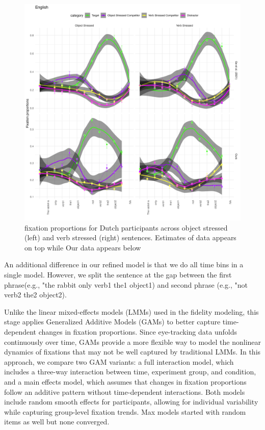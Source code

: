 \begin{figure}[H]  %
    \centering
    \includegraphics[width=\textwidth,height=\textheight,keepaspectratio]{viz/dutch_fix2.png}
    \caption{fixation proportions for Dutch participants across object stressed (left) and verb stressed (right) sentences. Estimates of \citep{Ge2021} data appears on top while Our data appears below}
    \label{fig:dutch_fix2}
\end{figure}

An additional difference in our refined model is that we do all time bins in a single model. However, we split the sentence at the gap between the first phrase(e.g., "the rabbit only verb1 the1 object1) and second phrase (e.g., "not verb2 the2 object2). 

Unlike the linear mixed-effects models (LMMs) used in the fidelity modeling, this stage applies Generalized Additive Models (GAMs) to better capture time-dependent changes in fixation proportions. Since eye-tracking data unfolds continuously over time, GAMs provide a more flexible way to model the nonlinear dynamics of fixations that may not be well captured by traditional LMMs. In this approach, we compare two GAM variants: a full interaction model, which includes a three-way interaction between time, experiment group, and condition, and a main effects model, which assumes that changes in fixation proportions follow an additive pattern without time-dependent interactions. Both models include random smooth effects for participants, allowing for individual variability while capturing group-level fixation trends. Max models started with random items as well but none converged.

